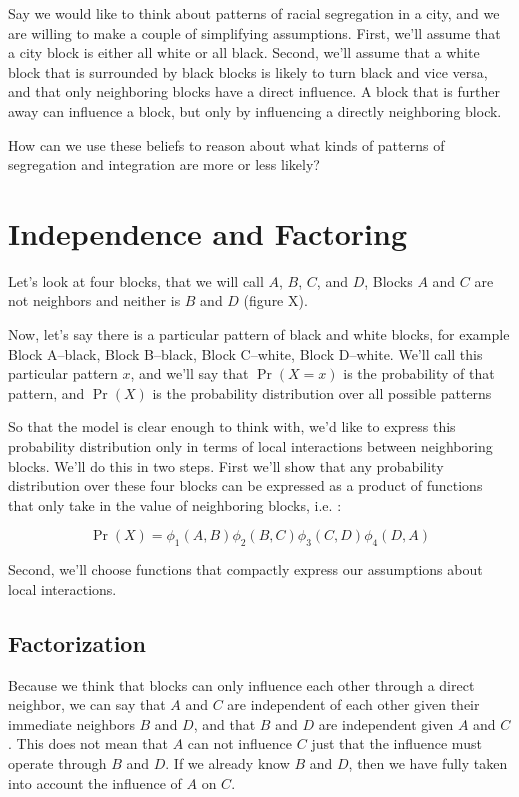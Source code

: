 \documentclass{article}
\begin{document}
Say we would like to think about patterns of racial segregation in a
city, and we are willing to make a couple of simplifying
assumptions. First, we'll assume that a city block is either all white
or all black. Second, we'll assume that a white block that is
surrounded by black blocks is likely to turn black and vice versa, and
that only neighboring blocks have a direct influence. A block that is
further away can influence a block, but only by influencing a directly
neighboring block.

How can we use these beliefs to reason about what kinds of patterns of
segregation and integration are more or less likely? 

\section*{Independence and Factoring}
Let's look at four blocks, that we will call $A$, $B$, $C$, and $D$,
Blocks $A$ and $C$ are not neighbors and neither is $B$ and $D$ (figure X).

Now, let's say there is a particular pattern of black and white
blocks, for example Block A--black, Block B--black, Block C--white,
Block D--white. We'll call this particular pattern $x$, and we'll say
that $\Pr(X=x)$ is the probability of that pattern, and $\Pr(X)$ is
the probability distribution over all possible patterns

So that the model is clear enough to think with, we'd like to express
this probability distribution only in terms of local interactions
between neighboring blocks. We'll do this in two steps. First we'll
show that any probability distribution over these four blocks can be
expressed as a product of functions that only take in the value of
neighboring blocks, i.e. :

\begin{equation}
  \Pr(X) = \phi_1(A,B)\phi_2(B,C)\phi_3(C,D)\phi_4(D,A) 
\end{equation}

Second, we'll choose functions that compactly express our assumptions
about local interactions.

\subsection*{Factorization}
Because we think that blocks can only influence each other through a
direct neighbor, we can say that $A$ and $C$ are independent of each
other given their immediate neighbors $B$ and $D$, and that $B$ and
$D$ are independent given $A$ and $C$. This does not mean that $A$ can
not influence $C$ just that the influence must operate through $B$ and
$D$. If we already know $B$ and $D$, then we have fully taken into
account the influence of $A$ on $C$.
\end{document}

